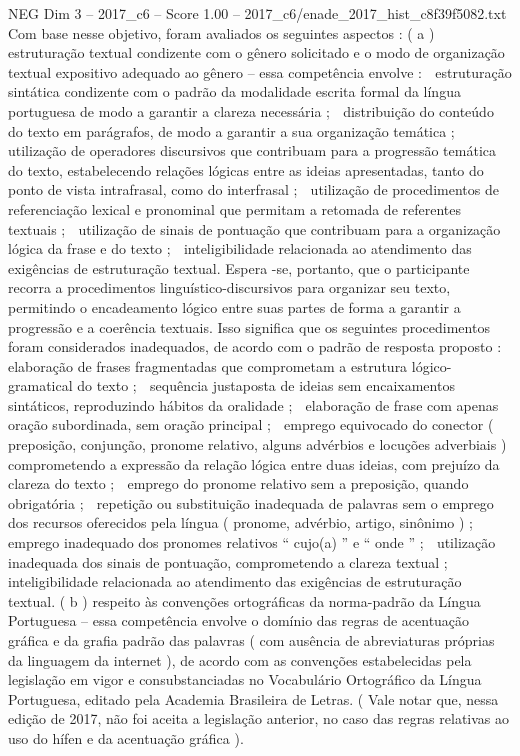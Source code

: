 \begin{textsample}{NEG Dim 3 – 2017\_c6 – Score 1.00 – 2017\_c6/enade\_2017\_hist\_c8f39f5082.txt}
Com base nesse objetivo, foram avaliados os seguintes aspectos : ( a ) estruturação textual condizente com o gênero solicitado e o modo de organização textual expositivo adequado ao gênero – essa competência envolve :  estruturação sintática condizente com o padrão da modalidade escrita formal da língua portuguesa de modo a garantir a clareza necessária ;  distribuição do conteúdo do texto em parágrafos, de modo a garantir a sua organização temática ;  utilização de operadores discursivos que contribuam para a progressão temática do texto, estabelecendo relações lógicas entre as ideias apresentadas, tanto do ponto de vista intrafrasal, como do interfrasal ;  utilização de procedimentos de referenciação lexical e pronominal que permitam a retomada de referentes textuais ;  utilização de sinais de pontuação que contribuam para a organização lógica da frase e do texto ;  inteligibilidade relacionada ao atendimento das exigências de estruturação textual.
Espera -se, portanto, que o participante recorra a procedimentos linguístico-discursivos para organizar seu texto, permitindo o encadeamento lógico entre suas partes de forma a garantir a progressão e a coerência textuais.
Isso significa que os seguintes procedimentos foram considerados inadequados, de acordo com o padrão de resposta proposto :  elaboração de frases fragmentadas que comprometam a estrutura lógico-gramatical do texto ;  sequência justaposta de ideias sem encaixamentos sintáticos, reproduzindo hábitos da oralidade ;  elaboração de frase com apenas oração subordinada, sem oração principal ;  emprego equivocado do conector ( preposição, conjunção, pronome relativo, alguns advérbios e locuções adverbiais ) comprometendo a expressão da relação lógica entre duas ideias, com prejuízo da clareza do texto ;  emprego do pronome relativo sem a preposição, quando obrigatória ;  repetição ou substituição inadequada de palavras sem o emprego dos recursos oferecidos pela língua ( pronome, advérbio, artigo, sinônimo ) ;  emprego inadequado dos pronomes relativos “ cujo(a) ” e “ onde ” ;  utilização inadequada dos sinais de pontuação, comprometendo a clareza textual ;  inteligibilidade relacionada ao atendimento das exigências de estruturação textual. ( b ) respeito às convenções ortográficas da norma-padrão da Língua Portuguesa – essa competência envolve o domínio das regras de acentuação gráfica e da grafia padrão das palavras ( com ausência de abreviaturas próprias da linguagem da internet ), de acordo com as convenções estabelecidas pela legislação em vigor e consubstanciadas no Vocabulário Ortográfico da Língua Portuguesa, editado pela Academia Brasileira de Letras. ( Vale notar que, nessa edição de 2017, não foi aceita a legislação anterior, no caso das regras relativas ao uso do hífen e da acentuação gráfica ).

\end{textsample}
